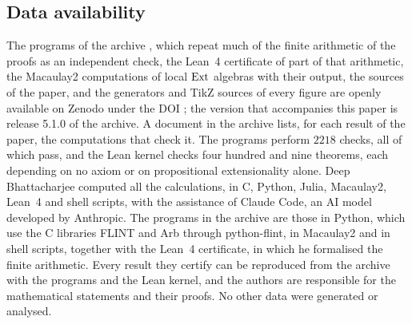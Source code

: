\subsection*{Data availability}
The programs of the archive \cite{Bha26}, which repeat much of the finite
arithmetic of the proofs as an independent check, the Lean~4 certificate of
part of that arithmetic, the Macaulay2
computations of local $\operatorname{Ext}$ algebras with their output, the sources of the
paper, and the generators and TikZ sources of every figure are openly
available on Zenodo under the DOI \zenodoCodeDOI; the version that
accompanies this paper is release 5.1.0 of the archive. A document in the
archive lists, for each result of the paper, the computations that check
it. The programs perform $2218$ checks, all of which pass, and the
Lean kernel checks four hundred and nine theorems, each depending on no axiom
or on propositional extensionality alone. Deep Bhattacharjee computed all
the calculations, in C, Python, Julia, Macaulay2, Lean~4 and shell scripts,
with the assistance of Claude Code, an AI model developed by Anthropic. The
programs in the archive are those in Python, which use the C libraries FLINT
and Arb through python-flint, in Macaulay2 and in shell scripts, together
with the Lean~4 certificate, in which he formalised the finite arithmetic.
Every result they certify can be reproduced from the archive
with the programs and the Lean kernel, and the authors are responsible for
the mathematical statements and their proofs. No other data were generated
or analysed.
